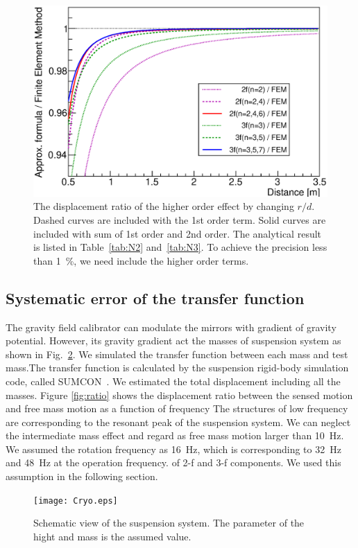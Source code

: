 \documentclass[A4]{spie}  %
\begin{document}
\begin{figure}
\begin{center}
\includegraphics[width=12cm]{dvsx_ratio.eps}
\caption{The displacement ratio of the higher order effect by changing $r/d$. Dashed curves are included with the 1st order term. Solid curves are included with sum of 1st order and 2nd order. The analytical result is listed in Table~\ref{tab:N2} and~\ref{tab:N3}. To achieve the precision less than 1~\%, we need include the higher order terms.}
\label{fig:FEM}
\end{center}
\end{figure}


\subsection{Systematic error of the transfer function}
The gravity field calibrator can modulate the mirrors with gradient of gravity potential. However, its gravity gradient act the masses of suspension system as shown in Fig.~\ref{fig:cryo}. We simulated the transfer function between each mass and test mass.The transfer function is calculated by the suspension rigid-body simulation code, called SUMCON~\cite{`}. We estimated the total displacement including all the masses. Figure \ref{fig:ratio} shows the displacement ratio between the sensed motion and free mass motion as a function of frequency The structures of low frequency are corresponding to the resonant peak of the suspension system. We can neglect the intermediate mass effect and regard as free mass motion larger than 10~Hz. We assumed the rotation frequency as 16~Hz, which is corresponding to 32~Hz and 48~Hz at the operation frequency. of 2-f and 3-f components.  We used this assumption in the following section.
\begin{figure}
\begin{center}
\texttt{[image: Cryo.eps]}
\caption{Schematic view of the suspension system. The parameter of the hight and mass is the assumed value. }
\label{fig:cryo}
\end{center}
\end{figure}
\end{document}

